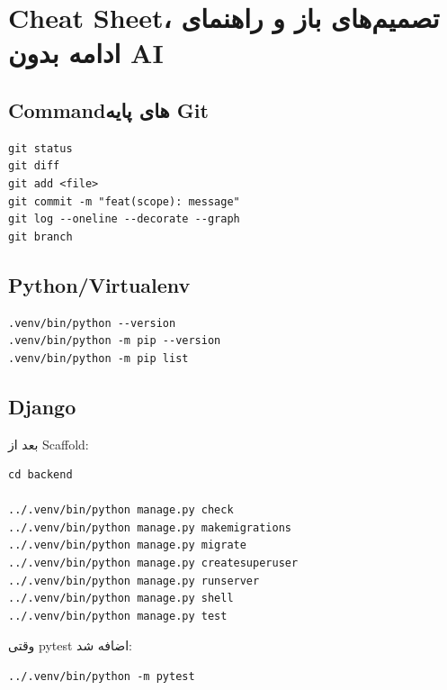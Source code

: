 
\chapter{Cheat Sheet، تصمیم‌های باز و راهنمای ادامه بدون AI}

\section{Commandهای پایه Git}

\begin{latin}
\begin{lstlisting}
git status
git diff
git add <file>
git commit -m "feat(scope): message"
git log --oneline --decorate --graph
git branch
\end{lstlisting}
\end{latin}

\section{Python/Virtualenv}

\begin{latin}
\begin{lstlisting}
.venv/bin/python --version
.venv/bin/python -m pip --version
.venv/bin/python -m pip list
\end{lstlisting}
\end{latin}

\section{Django}

بعد از Scaffold:
\begin{latin}
\begin{lstlisting}
cd backend

../.venv/bin/python manage.py check
../.venv/bin/python manage.py makemigrations
../.venv/bin/python manage.py migrate
../.venv/bin/python manage.py createsuperuser
../.venv/bin/python manage.py runserver
../.venv/bin/python manage.py shell
../.venv/bin/python manage.py test
\end{lstlisting}
\end{latin}

وقتی pytest اضافه شد:
\begin{latin}
\begin{lstlisting}
../.venv/bin/python -m pytest
\end{lstlisting}
\end{latin}

